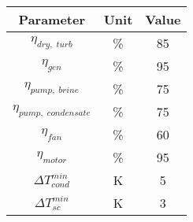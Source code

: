 \begin{tabular}{|c | c |c |}
    \hline
    \rowcolor{bluepoli!40} %
    \textbf{Parameter} & \textbf{Unit} & \textbf{Value} \T\B \\
    \hline \hline
    \(\eta_{dry,\;turb}\)  & \unit{\percent} & \num{85} \T\B \\
    \(\eta_{gen}\)  & \unit{\percent} & \num{95} \T\B \\
    \(\eta_{pump,\;brine}\)  & \unit{\percent} & \num{75} \T\B \\
    \(\eta_{pump,\;condensate}\)  & \unit{\percent} & \num{75} \T\B \\
    \(\eta_{fan}\)  & \unit{\percent} & \num{60} \T\B \\
    \(\eta_{motor}\)  & \unit{\percent} & \num{95} \T\B \\
    \(\Delta T_{cond}^{min}\)  & \unit{\K} & \num{5} \T\B \\
    \(\Delta T_{sc}^{min}\)  & \unit{\K} & \num{3} \T\B \\
    \hline
\end{tabular}